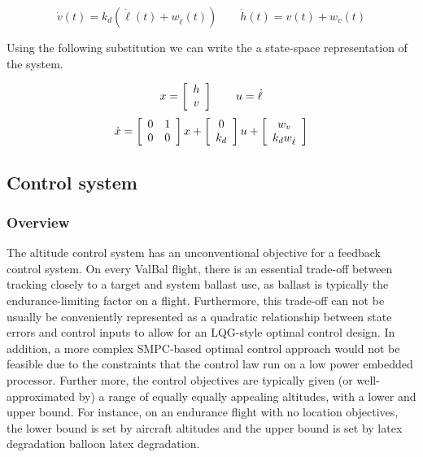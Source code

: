 \documentclass[11pt]{scrartcl} %
\begin{document}
\[ \dot v(t) = k_d(\dot \ell(t) + w_{\dot \ell}(t)) \qquad \dot h(t) = v(t) + w_v(t) \]

Using the following substitution we can write the a state-space representation of the system. 

\[x = \mx{c}{h \\ v} \qquad u = \dot \ell\]
\[\dot x = \mx{cc}{0 & 1 \\ 0 & 0}x + \mx{cc}{0 \\ k_d} u + \mx{c}{w_v \\ k_d w_{\dot \ell}}\]
\newpage
\subsection{Control system}
\subsubsection{Overview}
The altitude control system has an unconventional objective for a feedback control system. On every ValBal flight, there is an essential trade-off between tracking closely to a target and system ballast use, as ballast is typically the endurance-limiting factor on a flight. Furthermore, this trade-off can not be usually be conveniently represented as a quadratic relationship between state errors and control inputs to allow for an LQG-style optimal control design. In addition, a more complex SMPC-based optimal control approach would not be feasible due to the constraints that the control law run on a low power embedded processor. Further more, the control objectives are typically given (or well-approximated by) a range of equally equally appealing altitudes, with a lower and upper bound. For instance, on an endurance flight with no location objectives, the lower bound is set by aircraft altitudes and the upper bound is set by latex degradation balloon latex degradation. 
\end{document}
